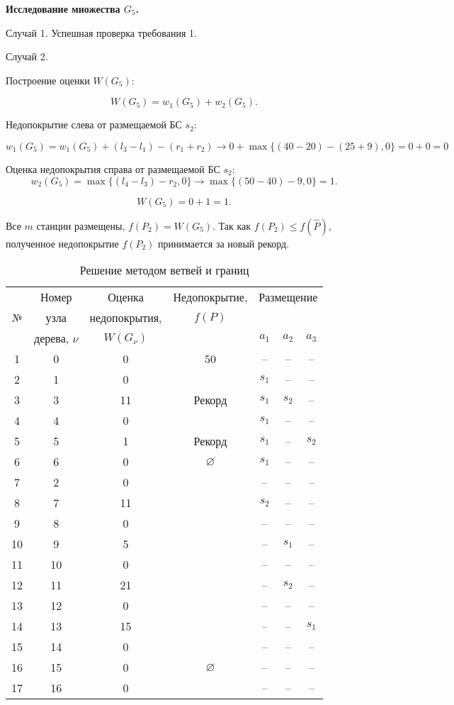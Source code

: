 \textbf{Исследование множества $G_5$.}

Случай 1. Успешная проверка требования 1.


Случай 2.

Построение оценки $W(G_5)$:

$$
W(G_5) = w_1(G_5) + w_2(G_5).
$$

Недопокрытие слева от размещаемой БС $s_2$:

$$
w_1(G_5) =  w_1(G_5) + (l_3 - l_1) - (r_1 + r_2) \rightarrow 0 + \max\{(40 - 20) - (25+ 9), 0\} = 0 + 0 = 0
$$

Оценка недопокрытия справа от размещаемой БС $s_2$: 
$$
w_2(G_5) = \max\{(l_4 - l_3) - r_2, 0\} \rightarrow \max\{(50 - 40) - 9, 0\} = 1.
$$

$$
W(G_5) = 0 + 1 = 1.
$$

Все $m$ станции размещены, $f(P_2) = W(G_5)$. Так как $f(P_2) \leqslant f(\widehat{P})$, полученное недопокрытие $f(P_2)$ принимается за новый рекорд.



\begin{longtable}[c]{| c | c | c | c | c  c c|}
  \caption{Решение методом ветвей и границ}\label{part4:branch_and_bound_solution}\\

  \hline
  \multirow{3}{*}{№}& Номер & Оценка & Недопокрытие, &  \multicolumn{3}{c|}{Размещение} \\

  &узла & недопокрытия,& $f(P)$ & &	&	\\ \cline{5-7}
  &дерева, $\nu$ &$W(G_\nu)$& & $a_1$&	$a_2$&	$a_3$\\
  \hline
  1&0 &0&50 & --&	--&	--\\
  2&1 &0& & $s_1$ &	--&	--\\
  3&3 &11& Рекорд & $s_1$ &	$s_2$&	--\\
  4&4 &0&  & $s_1$ &	--&	-- \\
  5&5 &1& Рекорд & $s_1$ &	--&	$s_2$ \\
  6&6 & 0& $\varnothing$& $s_1$ &	--&	-- \\
  7&2 &0& & --&	--&	--\\
  8&7 &11& & $s_2$&	--&	--\\
  9&8 &0& & --&	--&	--\\
  10&9 &5& & --&	$s_1$&	--\\
  11&10 &0& & --&	--&	--\\
  12&11 &21& & --&	$s_2$&	--\\
  13&12 &0& & --&	--&	--\\
  14&13 &15& & --&	--&	$s_1$\\
  15&14 &0& & --&	--&	--\\
  16&15 &0& $\varnothing$& --&	--&	--\\
  17&16 &0& & --&	--&	--\\


  \hline
\end{longtable}

